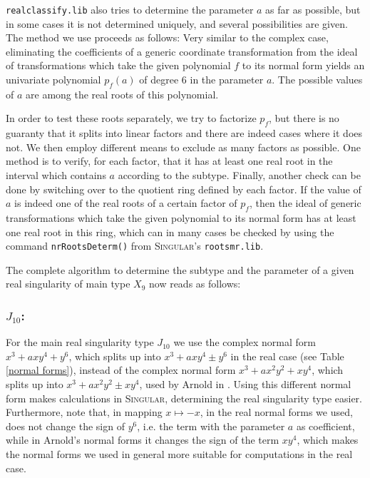 \documentclass[noend]{amsproc}
\newcommand{\Singular}{\textsc{Singular}}
\newcommand{\realclassify}{\texttt{realclassify.lib}}
\begin{document}
\realclassify{} also tries to determine the parameter $a$ as far as possible,
but in some cases it is not determined uniquely, and several possibilities are
given. The method we use proceeds as follows: Very similar to the complex case,
eliminating the coefficients of a generic coordinate transformation from the
ideal of transformations which take the given polynomial $f$ to its normal form
yields an univariate polynomial $p_f(a)$ of degree 6 in the parameter $a$. The
possible values of $a$ are among the real roots of this polynomial.

In order to
test these roots separately, we try to factorize $p_f$, but there is no
guaranty that it splits into linear factors and there are indeed cases where it
does not. We then employ different means to exclude as many
factors as possible. One method is to verify, for each factor, that it has at
least one real root in the interval which contains $a$ according to the
subtype. Finally, another check can be done by switching over to the
quotient ring defined by each factor. If the value of $a$ is indeed one of the
real roots of a certain factor of $p_f$, then the ideal of generic
transformations which take the given polynomial to its normal form has at least
one real root in this ring, which can in many cases be checked by using the
command \texttt{nrRootsDeterm()} from \Singular{}'s \texttt{rootsmr.lib}.

The complete algorithm to determine the subtype and the parameter of a given
real singularity of main type $X_9$ now reads as follows:


\subsubsection{$J_{10}$:}
For the main real singularity type $J_{10}$ we use the complex normal form
$x^3+axy^4+ y^6$, which splits up into $x^3+axy^4\pm y^6$ in the real case (see
Table \ref{normal forms}),  instead of the complex normal form
$x^3+ax^2y^2+xy^4$, which splits up into $x^3+ax^2y^2\pm xy^4$, used by Arnold
in \cite{AVG1985}. Using this different normal form makes calculations in
\textsc{Singular}, determining the real singularity type easier. Furthermore,
note that, in mapping $x\mapsto -x$, in the real normal forms we used, does not
change the sign of $y^6$, i.e. the term with the parameter $a$ as coefficient, while in Arnold's normal forms it changes the sign of
the term $xy^4$, which makes the normal forms we used in general more suitable
for computations in  the real case.
\end{document}
